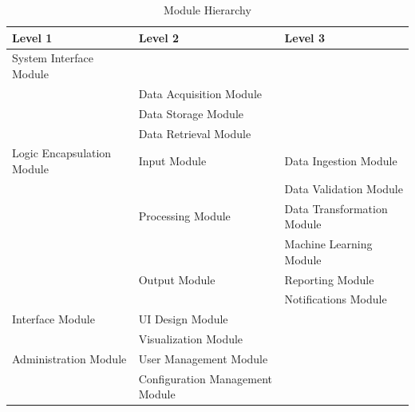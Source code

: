 \documentclass[12pt, titlepage]{article}
\begin{document}
\begin{table}[h!]
\centering
\begin{tabular}{p{} p{} p{}}
\toprule
\textbf{Level 1} & \textbf{Level 2} & \textbf{Level 3}\\
\midrule

{System Interface Module} & ~ & ~ \\
& Data Acquisition Module & \\
& Data Storage Module & \\
& Data Retrieval Module & \\
\midrule

{Logic Encapsulation Module} & Input Module & Data Ingestion Module\\
& & Data Validation Module\\
& Processing Module & Data Transformation Module\\
& & Machine Learning Module\\
& Output Module & Reporting Module\\
& & Notifications Module\\
\midrule

{Interface Module} & UI Design Module & \\
& Visualization Module & \\
\midrule

{Administration Module} & User Management Module & \\
& Configuration Management Module & \\
\bottomrule

\end{tabular}
\caption{Module Hierarchy}
\label{TblMH}
\end{table}
\end{document}
